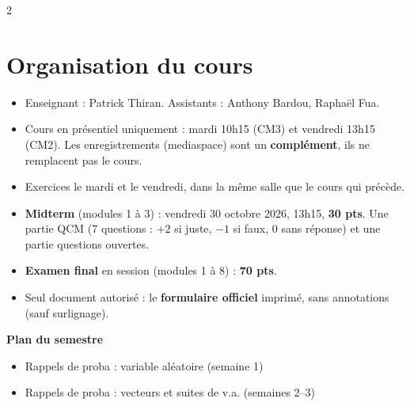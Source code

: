 \documentclass[a4paper,9pt]{extarticle}
\begin{document}

\thispagestyle{fancy}



\begin{multicols}{2}


\section{Organisation du cours}


\begin{summary}

\begin{itemize}

\item Enseignant : Patrick Thiran. Assistants : Anthony Bardou, Raphaël Fua.

\item Cours en présentiel uniquement : mardi 10h15 (CM3) et vendredi 13h15 (CM2). Les
enregistrements (mediaspace) sont un \textbf{complément}, ils ne remplacent pas le cours.

\item Exercices le mardi et le vendredi, dans la même salle que le cours qui précède.

\item \textbf{Midterm} (modules 1 à 3) : vendredi 30 octobre 2026, 13h15, \textbf{30 pts}.
Une partie QCM (7 questions : $+2$ si juste, $-1$ si faux, $0$ sans réponse) et une partie
questions ouvertes.

\item \textbf{Examen final} en session (modules 1 à 8) : \textbf{70 pts}.

\item Seul document autorisé : le \textbf{formulaire officiel} imprimé, sans annotations
(sauf surlignage).

\end{itemize}

\end{summary}


\textbf{Plan du semestre}

\begin{itemize}

\item Rappels de proba : variable aléatoire (semaine 1)

\item Rappels de proba : vecteurs et suites de v.a. (semaines 2--3)


\end{itemize}
\end{multicols}
\end{document}
